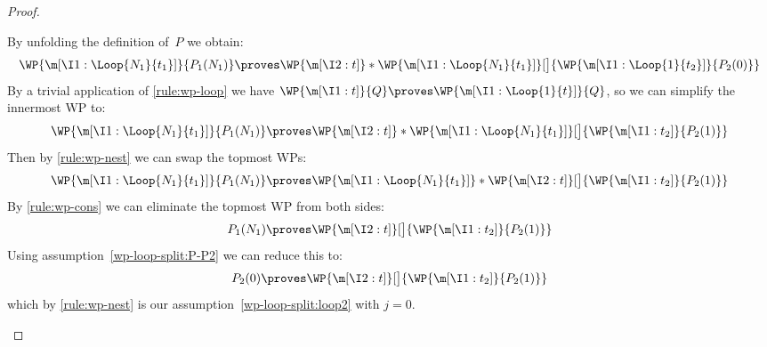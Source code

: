 \begin{proof}
\begin{casesplit}
  \case[$k=N_1$] By unfolding the definition of~$P$ we obtain:
    \[
      \WP {\m[\I1: \Loop{N_1}{t_1}]} { P_1(N_1) }
      \proves
      \WP {\m[\I2: t]}*{
        \WP {\m[\I1: \Loop{N_1}{t_1}]}[\big]{
          \WP {\m[\I1: \Loop{1}{t_2}]} { P_2(0) }
        }
      }
    \]
    By a trivial application of \ref{rule:wp-loop}
    we have $
      \WP {\m[\I1: t]} { Q }
      \proves
      \WP {\m[\I1: \Loop{1}{t}]} { Q }
    $, so we can simplify the innermost WP to:
    \[
      \WP {\m[\I1: \Loop{N_1}{t_1}]} { P_1(N_1) }
      \proves
      \WP {\m[\I2: t]}*{
        \WP {\m[\I1: \Loop{N_1}{t_1}]}[\big]{
          \WP {\m[\I1: t_2]} { P_2(1) }
        }
      }
    \]
    Then by \ref{rule:wp-nest} we can swap the topmost WPs:
    \[
      \WP {\m[\I1: \Loop{N_1}{t_1}]} { P_1(N_1) }
      \proves
      \WP {\m[\I1: \Loop{N_1}{t_1}]}*{
        \WP {\m[\I2: t]}[\big]{
          \WP {\m[\I1: t_2]} { P_2(1) }
        }
      }
    \]
    By \ref{rule:wp-cons} we can eliminate the topmost WP from both sides:
    \[
      P_1(N_1)
      \proves
      \WP {\m[\I2: t]}[\big]{
        \WP {\m[\I1: t_2]} { P_2(1) }
      }
    \]
    Using assumption~\eqref{wp-loop-split:P-P2} we can reduce this to:
    \[
      P_2(0)
      \proves
      \WP {\m[\I2: t]}[\big]{
        \WP {\m[\I1: t_2]} { P_2(1) }
      }
    \]
    which by \ref{rule:wp-nest} is our assumption~\eqref{wp-loop-split:loop2}
    with $j=0$.


\end{casesplit}
\end{proof}
